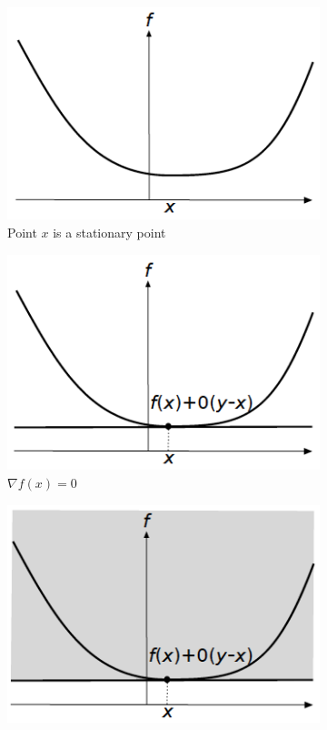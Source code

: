 \begin{figure}
    \centering
    \begin{subfigure}{0.31\textwidth}
    \includegraphics[width=\linewidth]{figures/2/first-order-convex/7.png}
    \caption{Point $x$ is a stationary point} \label{fig:foc7}
    \end{subfigure}
    \begin{subfigure}{0.31\textwidth}
    \includegraphics[width=\linewidth]{figures/2/first-order-convex/8.png}
    \caption{$\nabla f(x) = 0$} \label{fig:foc8}
    \end{subfigure}
    \begin{subfigure}{0.31\textwidth}
    \includegraphics[width=\linewidth]{figures/2/first-order-convex/9.png}

\end{subfigure}
\end{figure}

